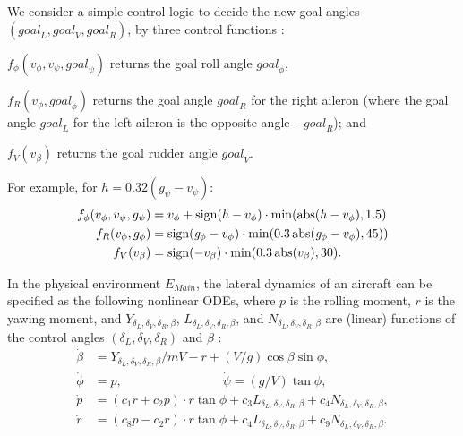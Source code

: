 We consider a simple control logic to decide 
the new goal angles $(\mathit{goal}_L,\mathit{goal}_V,\mathit{goal}_R)$,
by three control functions \cite{ftscs-journal}:
%
\begin{inparaenum}[(i)]
	\item $f_\phi(v_\phi, v_\psi, \mathit{goal}_\psi)$
		returns the goal roll angle $\mathit{goal}_\phi$,
	\item $f_{R}(v_\phi, \mathit{goal}_\phi)$ returns the goal angle $\mathit{goal}_R$ for the right aileron
	(where the goal angle $\mathit{goal}_L$ for the left aileron is the opposite angle $- \mathit{goal}_R$);
	and
	\item $f_V(v_\beta)$ returns the goal rudder angle $\mathit{goal}_V$.
\end{inparaenum}
For example, for $h = 0.32  (\mathit{g}_\psi - v_\psi)$:
\begin{align*}
f_\phi(v_\phi, v_\psi, g_\psi) &= 
v_\phi + \mathrm{sign}(h - v_\phi) \cdot \min(\mathrm{abs}(h - v_\phi),1.5)
\\
f_{R}(v_\phi, g_\phi) &=
\mathrm{sign}(\mathit{g}_\phi - v_\phi)\cdot \min(0.3 \,\mathrm{abs}(\mathit{g}_\phi - v_\phi), 45))
\\
f_V(v_\beta) &=
\mathrm{sign}(-v_\beta)\cdot \min(0.3  \,\mathrm{abs}(v_\beta), 30).
\end{align*}

In the physical environment $E_\mathit{Main}$,
the lateral dynamics of an aircraft
can be specified as the following nonlinear ODEs,
where $p$ is the rolling moment, $r$ is the yawing moment,
and $Y_{\delta_L,\delta_V,\delta_R,\beta}$, $L_{\delta_L,\delta_V,\delta_R,\beta}$, and $N_{\delta_L,\delta_V,\delta_R,\beta}$
are (linear) functions of the control angles $(\delta_L,\delta_V,\delta_R)$ 
and $\beta$
\cite{stevens2003aircraft}:
%
\begin{align*}
\dot{\beta} &= Y_{\delta_L,\delta_V,\delta_R,\beta} / m V - r + (V / g) \cos \beta \sin \phi,
\\
\dot{\phi} &= p,
\qquad\qquad\qquad\qquad
\dot{\psi} = (g / V) \tan \phi,
\\
\dot{p} &= (c_1 r + c_2 p) \cdot r  \tan \phi + c_3 L_{\delta_L,\delta_V,\delta_R,\beta} + c_4 N_{\delta_L,\delta_V,\delta_R,\beta},
\\
\dot{r} &= (c_8 p - c_2 r)  \cdot r  \tan \phi + c_4 L_{\delta_L,\delta_V,\delta_R,\beta} + c_9 N_{\delta_L,\delta_V,\delta_R,\beta}.
\end{align*}
%


